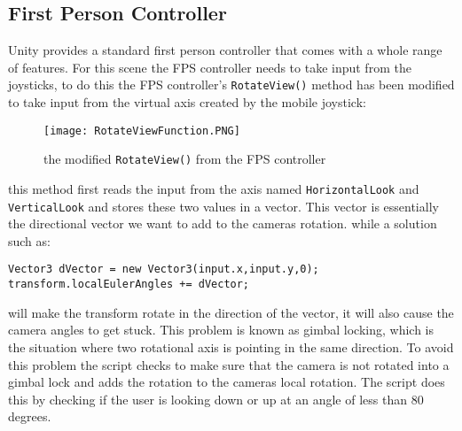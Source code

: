 \subsection*{First Person Controller}
Unity provides a standard first person controller that comes with a whole range of features. For this scene the FPS controller needs to take input from the joysticks, to do this the FPS controller's {\tt RotateView()} method has been modified to take input from the virtual axis created by the mobile joystick:
\begin{figure}[H]
\centering
\texttt{[image: RotateViewFunction.PNG]}
\caption{the modified {\tt RotateView()} from the FPS controller}
\end{figure}
this method first reads the input from the axis named {\tt HorizontalLook} and {\tt VerticalLook} and stores these two values in a vector. This vector is essentially the directional vector we want to add to the cameras rotation. while a solution such as:
\begin{verbatim}
Vector3 dVector = new Vector3(input.x,input.y,0);
transform.localEulerAngles += dVector;
\end{verbatim} will make the transform rotate in the direction of the vector, it will also cause the camera angles to get stuck. This problem is known as gimbal locking, which is the situation where two rotational axis is pointing in the same direction. To avoid this problem the script checks to make sure that the camera is not rotated into a gimbal lock and adds the rotation to the cameras local rotation. The script does this by checking if the user is looking down or up at an angle of less than 80 degrees. 



